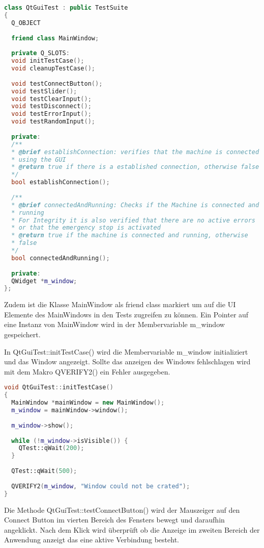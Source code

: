 		\begin{lstlisting}[language=C++, caption=qtguitest.cpp]		
class QtGuiTest : public TestSuite
{
  Q_OBJECT
	
  friend class MainWindow;
	
  private Q_SLOTS:
  void initTestCase();
  void cleanupTestCase();
	
  void testConnectButton();
  void testSlider();
  void testClearInput();
  void testDisconnect();
  void testErrorInput();
  void testRandomInput();
	
  private:
  /**
  * @brief establishConnection: verifies that the machine is connected
  * using the GUI
  * @return true if there is a established connection, otherwise false
  */
  bool establishConnection();
	
  /**
  * @brief connectedAndRunning: Checks if the Machine is connected and
  * running
  * For Integrity it is also verified that there are no active errors
  * or that the emergency stop is activated
  * @return true if the machine is connected and running, otherwise
  * false
  */
  bool connectedAndRunning();
	
  private:
  QWidget *m_window;
};
		\end{lstlisting}
	
		Zudem ist die Klasse MainWindow als friend class markiert um auf die UI Elemente des MainWindows in den Tests zugreifen zu können. Ein Pointer auf eine Instanz von MainWindow wird in der Membervariable m\_window gespeichert.
		
		In QtGuiTest::initTestCase() wird die Membervariable m\_window initializiert und das Window angezeigt. Sollte das anzeigen des Windows fehlschlagen wird mit dem Makro QVERIFY2() ein Fehler ausgegeben.
		
		\begin{lstlisting}[language=C++, caption=qtguitest.cpp]	
void QtGuiTest::initTestCase()
{
  MainWindow *mainWindow = new MainWindow();
  m_window = mainWindow->window();
	
  m_window->show();
	
  while (!m_window->isVisible()) {
    QTest::qWait(200);
  }
	
  QTest::qWait(500);
	
  QVERIFY2(m_window, "Window could not be crated");
}		
		\end{lstlisting}
		Die Methode QtGuiTest::testConnectButton() wird der Mauszeiger auf den Connect Button im vierten Bereich des Fensters bewegt und daraufhin angeklickt. Nach dem Klick wird überprüft ob die Anzeige im zweiten Bereich der Anwendung anzeigt das eine aktive Verbindung besteht.
	
